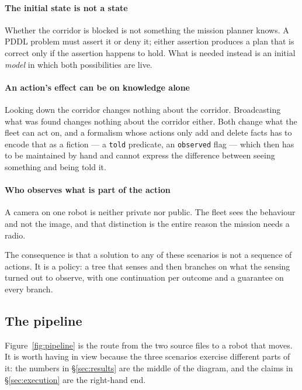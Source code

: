 \documentclass[11pt,a4paper]{article}
\begin{document}
\paragraph{The initial state is not a state} Whether the corridor is blocked is
not something the mission planner knows. A PDDL problem must assert it or deny
it; either assertion produces a plan that is correct only if the assertion
happens to hold. What is needed instead is an initial \emph{model} in which both
possibilities are live.

\paragraph{An action's effect can be on knowledge alone} Looking down the
corridor changes nothing about the corridor. Broadcasting what was found
changes nothing about the corridor either. Both change what the fleet can act
on, and a formalism whose actions only add and delete facts has to encode that
as a fiction --- a \texttt{told} predicate, an \texttt{observed} flag --- which
then has to be maintained by hand and cannot express the difference between
seeing something and being told it.

\paragraph{Who observes what is part of the action} A camera on one robot is
neither private nor public. The fleet sees the behaviour and not the image, and
that distinction is the entire reason the mission needs a radio.

The consequence is that a solution to any of these scenarios is not a sequence
of actions. It is a policy: a tree that senses and then branches on what the
sensing turned out to observe, with one continuation per outcome and a
guarantee on every branch.

\subsection{The pipeline}

Figure~\ref{fig:pipeline} is the route from the two source files to a robot
that moves. It is worth having in view because the three scenarios exercise
different parts of it: the numbers in \S\ref{sec:results} are the middle of the
diagram, and the claims in \S\ref{sec:execution} are the right-hand end.
\end{document}
